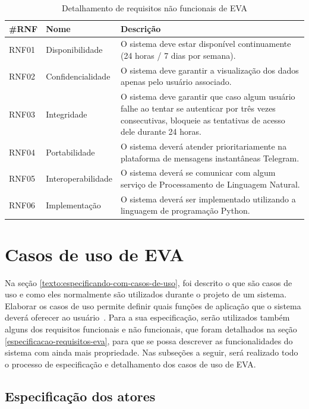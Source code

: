 \begin{table}[htb!]
\caption{Detalhamento de requisitos não funcionais de EVA}
\label{tabela:tabela2}
\center
\footnotesize
\begin{tabular}{|p{1.2cm}|p{3.5cm}|p{7.5cm}|}
  \hline
   \textbf{\#RNF} & \textbf{Nome}  & \textbf{Descrição}  \\
   \hline
    RNF01 & Disponibilidade & O sistema deve estar disponível continuamente (24 horas / 7 dias por semana). \\
   \hline
    RNF02 & Confidencialidade & O sistema deve garantir a visualização dos dados apenas pelo usuário associado. \\
   \hline
    RNF03 & Integridade & O sistema deve garantir que caso algum usuário falhe ao tentar se autenticar por três vezes consecutivas, bloqueie as tentativas de acesso dele durante 24 horas. \\
   \hline
   RNF04 & Portabilidade & O sistema deverá atender prioritariamente na plataforma de mensagens instantâneas Telegram. \\
   \hline
    RNF05 & Interoperabilidade & O sistema deverá se comunicar com algum serviço de Processamento de Linguagem Natural. \\
   \hline
    RNF06 & Implementação & O sistema deverá ser implementado utilizando a linguagem de programação Python. \\
   \hline
   
\end{tabular}
\end{table}\label{tabela:3}

\section{Casos de uso de EVA}\label{casos-de-uso-eva}

Na seção \ref{texto:especificando-com-casos-de-uso}, foi descrito o que são casos de uso e como eles normalmente são utilizados durante o projeto de um sistema. Elaborar os casos de uso permite definir quais funções de aplicação que o sistema deverá oferecer ao usuário~\cite{ReqJair}. Para a sua especificação, serão utilizados também alguns dos requisitos funcionais e não funcionais, que foram detalhados na seção \ref{especificacao-requisitos-eva}, para que se possa descrever as funcionalidades do sistema com ainda mais propriedade. Nas subseções a seguir, será realizado todo o processo de especificação e detalhamento dos casos de uso de EVA.

\subsection{Especificação dos atores}

